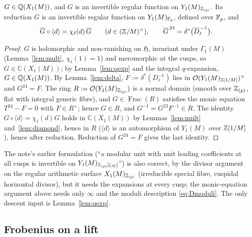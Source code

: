 \begin{proposition}\label{prop:Gint}
$G\in\mathbb Q(X_1(M))$, and $G$ is an invertible regular function on $Y_1(M)_{\mathbb Z_{(p)}}$. Its reduction
$\overline G$ is an invertible regular function on $Y_1(M)_{\mathbb F_p}$, defined over $\mathbb F_p$, and
\[
\overline G\circ\langle d\rangle=\chi_\ell(d)\,\overline G\qquad(d\in(\mathbb Z/M)^\times),\qquad
\overline G^{\,24}=\delta^*\bigl(\overline D_\ell^{\,-1}\bigr).
\]
\end{proposition}
\begin{proof}
$G$ is holomorphic and non-vanishing on $\mathfrak H$, invariant under $\Gamma_1(M)$
(Lemma~\ref{lem:mult}, $\chi_\ell(1)=1$) and meromorphic at the cusps, so $G\in\mathbb C(X_1(M))$;
by Lemma~\ref{lem:qexp} and the integral $q$-expansion, $G\in\mathbb Q(X_1(M))$. By
Lemma~\ref{lem:delta}, $F:=\delta^*(D_\ell^{-1})$ lies in $\mathcal O(Y_1(M)_{\mathbb Z[1/M]})^\times$ and
$G^{24}=F$. The ring $R:=\mathcal O(Y_1(M)_{\mathbb Z_{(p)}})$ is a normal domain (smooth over $\mathbb Z_{(p)}$,
flat with integral generic fibre), and $G\in\operatorname{Frac}(R)$ satisfies the monic equation
$T^{24}-F=0$ with $F\in R^\times$; hence $G\in R$, and $G^{-1}=G^{23}F^{-1}\in R$. The identity
$G\circ\langle d\rangle=\chi_\ell(d)G$ holds in $\mathbb C(X_1(M))$ by Lemmas~\ref{lem:mult}
and~\ref{lem:diamond}, hence in $R$ ($\langle d\rangle$ is an automorphism of $Y_1(M)$ over
$\mathbb Z[1/M]$), hence after reduction. Reduction of $G^{24}=F$ gives the last identity.
\end{proof}

\begin{remark}
The note's earlier formulation (``a modular unit with unit leading coefficients at all cusps is
invertible on $Y_1(M)_{\mathbb Z_{(p)}[\zeta_M]}$'') is also correct, by the divisor argument on the regular
arithmetic surface $X_1(M)_{\mathbb Z_{(p)}}$ (irreducible special fibre, cuspidal horizontal divisor), but
it needs the expansions at every cusp; the monic-equation argument above needs only $\infty$ and the
moduli description \eqref{eq:Dmoduli}. The only descent input is Lemma~\ref{lem:qexp}.
\end{remark}

\subsection{Frobenius on a lift}

